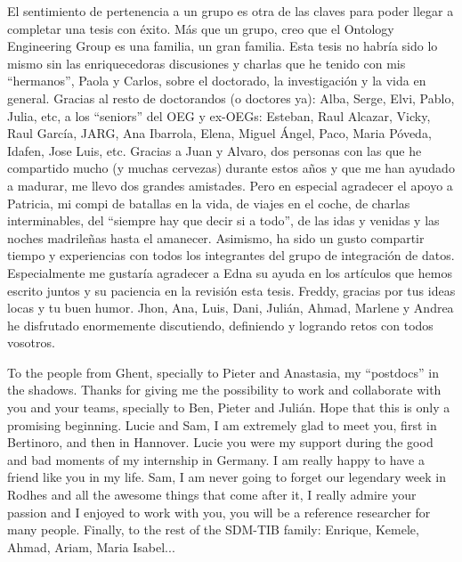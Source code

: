 \begin{acknowledgementslong}
El sentimiento de pertenencia a un grupo es otra de las claves para poder llegar a completar una tesis con éxito. Más que un grupo, creo que el Ontology Engineering Group es una familia, un gran familia. Esta tesis no habría sido lo mismo sin las enriquecedoras discusiones y charlas que he tenido con mis ``hermanos'', Paola y Carlos, sobre el doctorado, la investigación y la vida en general. Gracias al resto de doctorandos (o doctores ya): Alba, Serge, Elvi, Pablo, Julia, etc, a los ``seniors'' del OEG y ex-OEGs: Esteban, Raul Alcazar, Vicky, Raul García, JARG, Ana Ibarrola, Elena, Miguel Ángel, Paco, Maria Póveda, Idafen, Jose Luis, etc. Gracias a Juan y Alvaro, dos personas con las que he compartido mucho (y muchas cervezas) durante estos años y que me han ayudado a madurar, me llevo dos grandes amistades. Pero en especial agradecer el apoyo a Patricia, mi compi de batallas en la vida, de viajes en el coche, de charlas interminables, del ``siempre hay que decir si a todo'', de las idas y venidas y las noches madrileñas hasta el amanecer. Asimismo, ha sido un gusto compartir tiempo y experiencias con todos los integrantes del grupo de integración de datos. Especialmente me gustaría agradecer a Edna su ayuda en los artículos que hemos escrito juntos y su paciencia en la revisión esta tesis. Freddy, gracias por tus ideas locas y tu buen humor. Jhon, Ana, Luis, Dani, Julián, Ahmad, Marlene y Andrea he disfrutado enormemente discutiendo, definiendo y logrando retos con todos vosotros. 

To the people from Ghent, specially to Pieter and Anastasia, my ``postdocs'' in the shadows. Thanks for giving me the possibility to work and collaborate with you and your teams, specially to Ben, Pieter and Julián. Hope that this is only a promising beginning. Lucie and Sam, I am extremely glad to meet you, first in Bertinoro, and then in Hannover. Lucie you were my support during the good and bad moments of my internship in Germany. I am really happy to have a friend like you in my life. Sam, I am never going to forget our legendary week in Rodhes and all the awesome things that come after it, I really admire your passion and I enjoyed to work with you, you will be a reference researcher for many people. Finally, to the rest of the SDM-TIB family: Enrique, Kemele, Ahmad, Ariam, Maria Isabel...


\end{acknowledgementslong}
